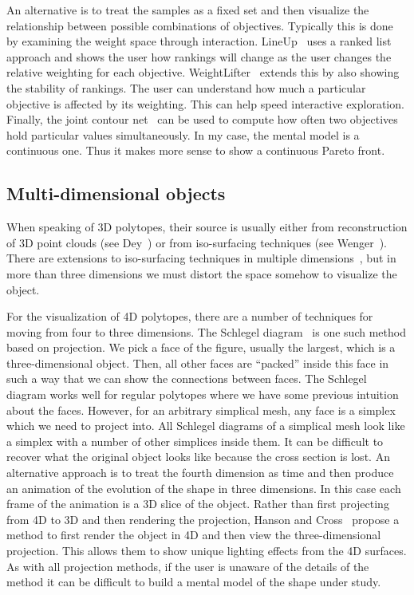 An alternative is to treat the samples as a fixed set and then visualize the
relationship between possible combinations of objectives. Typically this is
done by examining the weight space through interaction. 
LineUp~\cite{Gratzl:2013} uses a ranked list approach and shows the user
how rankings will change as the user changes the relative weighting for each
objective. WeightLifter~\cite{Pajer:2016} extends this by also showing the
stability of rankings. The user can understand how much a particular objective
is affected by its weighting. This can help speed interactive exploration. 
Finally, the joint contour net~\cite{Carr:2014} can be used to compute how
often two objectives hold particular values simultaneously. 
In my case, the mental model is a continuous one. Thus it makes more sense
to show a continuous Pareto front.

\subsection{Multi-dimensional objects}

When speaking of 3D polytopes, their source is usually either from reconstruction of 3D point clouds 
(see Dey~\cite{Dey:2006})
or from iso-surfacing techniques (see Wenger~\cite{Wenger:2013}).
There are extensions to iso-surfacing techniques in multiple dimensions~\cite{Bhaniramka:2000}, 
but in more than three dimensions we must distort the space somehow to visualize the object. 

For the visualization of 4D polytopes, there are a number of techniques for moving from four to three dimensions.  The
Schlegel diagram~\cite{Sommerville:1929} is one such method based on
projection. We pick a face of the figure, usually the largest, which is a
three-dimensional object. Then, all other faces are ``packed'' inside this face in
such a way that we can show the connections between faces. The Schlegel diagram
works well for regular polytopes where we have some previous intuition about
the faces. However, for an arbitrary simplical mesh, any face is a simplex
which we need to project into. All Schlegel diagrams of a simplical mesh look
like a simplex with a number of other simplices inside them. It can be
difficult to recover what the original object looks like because the
cross section is lost. An alternative approach is to treat the fourth dimension
as time and then produce an animation of the evolution of the shape in three
dimensions. In this case each frame of the animation is a 3D slice of the 
object. Rather than first projecting from 4D to 3D and then rendering the
projection, Hanson and Cross~\cite{Hanson:1993} propose a method to first
render the object in 4D and then view the three-dimensional projection. This
allows them to show unique lighting effects from the 4D surfaces.
As with all projection methods, if the user is unaware of the details of the
method it can be difficult to build a mental model of the shape under study.


